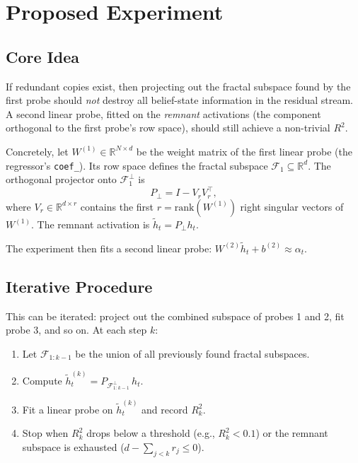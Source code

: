 \documentclass[11pt]{article}
\begin{document}
\section{Proposed Experiment}

\subsection{Core Idea}

If redundant copies exist, then projecting out the fractal subspace found by the first probe should \emph{not} destroy all belief-state information in the residual stream.  A second linear probe, fitted on the \emph{remnant} activations (the component orthogonal to the first probe's row space), should still achieve a non-trivial $R^2$.

Concretely, let $W^{(1)} \in \mathbb{R}^{N \times d}$ be the weight matrix of the first linear probe (the regressor's \texttt{coef\_}).  Its row space defines the fractal subspace $\mathcal{F}_1 \subseteq \mathbb{R}^d$.  The orthogonal projector onto $\mathcal{F}_1^\perp$ is
\begin{equation}
  P_\perp = I - V_r V_r^\top,
\end{equation}
where $V_r \in \mathbb{R}^{d \times r}$ contains the first $r = \mathrm{rank}(W^{(1)})$ right singular vectors of $W^{(1)}$.  The remnant activation is $\tilde{h}_t = P_\perp h_t$.

The experiment then fits a second linear probe: $W^{(2)} \tilde{h}_t + b^{(2)} \approx \alpha_t$.

\subsection{Iterative Procedure}

This can be iterated: project out the combined subspace of probes 1 and 2, fit probe 3, and so on.  At each step $k$:
\begin{enumerate}
  \item Let $\mathcal{F}_{1:k-1}$ be the union of all previously found fractal subspaces.
  \item Compute $\tilde{h}_t^{(k)} = P_{\mathcal{F}_{1:k-1}^\perp}\, h_t$.
  \item Fit a linear probe on $\tilde{h}_t^{(k)}$ and record $R^2_k$.
  \item Stop when $R^2_k$ drops below a threshold (e.g., $R^2_k < 0.1$) or the remnant subspace is exhausted ($d - \sum_{j<k} r_j \leq 0$).
\end{enumerate}
\end{document}
